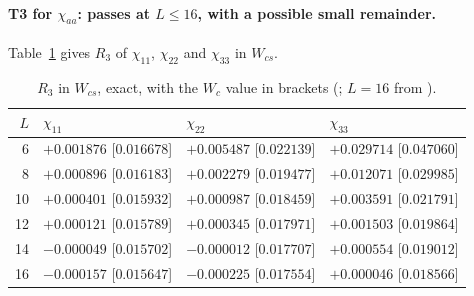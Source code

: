 \paragraph{T3 for $\chi_{aa}$: passes at $L\le16$, with a possible small remainder.} Table~\ref{htp:d2:tab:wcsr3} gives $R_3$ of
$\chi_{11}$, $\chi_{22}$ and $\chi_{33}$ in $W_{cs}$.

\begin{table}[ht]
\centering\footnotesize\renewcommand{\arraystretch}{1.15}
\begin{tabular}{@{}rlll@{}}
\toprule
$L$ & $\chi_{11}$ & $\chi_{22}$ & $\chi_{33}$ \\\midrule
6 & $+0.001876$ [$0.016678$] & $+0.005487$ [$0.022139$] & $+0.029714$ [$0.047060$] \\
8 & $+0.000896$ [$0.016183$] & $+0.002279$ [$0.019477$] & $+0.012071$ [$0.029985$] \\
10 & $+0.000401$ [$0.015932$] & $+0.000987$ [$0.018459$] & $+0.003591$ [$0.021791$] \\
12 & $+0.000121$ [$0.015789$] & $+0.000345$ [$0.017971$] & $+0.001503$ [$0.019864$] \\
14 & $-0.000049$ [$0.015702$] & $-0.000012$ [$0.017707$] & $+0.000554$ [$0.019012$] \\
16 & $-0.000157$ [$0.015647$] & $-0.000225$ [$0.017554$] & $+0.000046$ [$0.018566$] \\
\bottomrule
\end{tabular}
\caption{$R_3$ in $W_{cs}$, exact, with the $W_c$ value in brackets (;
$L=16$ from ).}
\label{htp:d2:tab:wcsr3}
\end{table}

